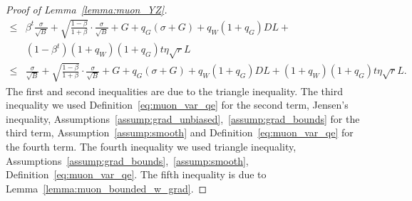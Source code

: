 \documentclass[11pt, letterpaper]{article}
\begin{document}
\begin{proof}[Proof of Lemma~\ref{lemma:muon_YZ}]
\begin{align*}
    \le& \beta^t\frac{\sigma}{\sqrt{B}} + \sqrt{\frac{1-\beta}{1+\beta}}\cdot\frac{\sigma}{\sqrt{B}} + G + q_G(\sigma + G) + q_W (1+q_G)DL + \\
    & (1-\beta^t)(1+q_W)(1+q_G)t\eta\sqrt{r}L \\
    \le& \frac{\sigma}{\sqrt{B}} + \sqrt{\frac{1-\beta}{1+\beta}}\cdot\frac{\sigma}{\sqrt{B}} + G + q_G(\sigma + G) + q_W (1+q_G)DL + (1+q_W)(1+q_G)t\eta\sqrt{r}L.
\end{align*}
The first and second inequalities are due to the triangle inequality. The third inequality we used Definition~\ref{eq:muon_var_qe} for the second term, Jensen's inequality, Assumptions~\ref{assump:grad_unbiased},~\ref{assump:grad_bounds} for the third term, Assumption~\ref{assump:smooth} and Definition~\ref{eq:muon_var_qe} for the fourth term. The fourth inequality we used triangle inequality, Assumptions~\ref{assump:grad_bounds},~\ref{assump:smooth}, Definition~\ref{eq:muon_var_qe}. The fifth inequality is due to Lemma~\ref{lemma:muon_bounded_w_grad}.


\end{proof}















\end{document}
